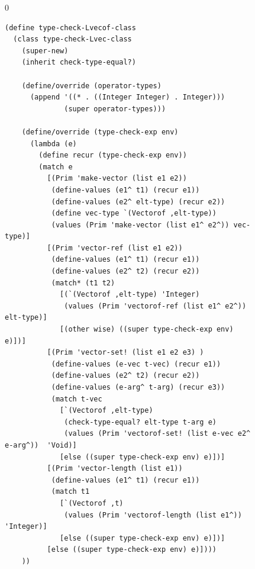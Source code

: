 \documentclass[7x10]{TimesAPriori_MIT}%
\def\racketEd{0}
\def\edition{1}
\numberwithin{theorem}{chapter}
\numberwithin{definition}{chapter}
\numberwithin{equation}{chapter}
\begin{document}
\begin{figure}[tbp]
  \begin{tcolorbox}[colback=white]
{\if\edition\racketEd    
    \begin{lstlisting}[basicstyle=\ttfamily\footnotesize]
(define type-check-Lvecof-class
  (class type-check-Lvec-class
    (super-new)
    (inherit check-type-equal?)

    (define/override (operator-types)
      (append '((* . ((Integer Integer) . Integer)))
              (super operator-types)))
    
    (define/override (type-check-exp env)
      (lambda (e)
        (define recur (type-check-exp env))
        (match e
          [(Prim 'make-vector (list e1 e2))
           (define-values (e1^ t1) (recur e1))
           (define-values (e2^ elt-type) (recur e2))
           (define vec-type `(Vectorof ,elt-type))
           (values (Prim 'make-vector (list e1^ e2^)) vec-type)]
          [(Prim 'vector-ref (list e1 e2))
           (define-values (e1^ t1) (recur e1))
           (define-values (e2^ t2) (recur e2))
           (match* (t1 t2)
             [(`(Vectorof ,elt-type) 'Integer)
              (values (Prim 'vectorof-ref (list e1^ e2^)) elt-type)]
             [(other wise) ((super type-check-exp env) e)])]
          [(Prim 'vector-set! (list e1 e2 e3) )
           (define-values (e-vec t-vec) (recur e1))
           (define-values (e2^ t2) (recur e2))
           (define-values (e-arg^ t-arg) (recur e3))
           (match t-vec
             [`(Vectorof ,elt-type)
              (check-type-equal? elt-type t-arg e)
              (values (Prim 'vectorof-set! (list e-vec e2^ e-arg^))  'Void)]
             [else ((super type-check-exp env) e)])]
          [(Prim 'vector-length (list e1))
           (define-values (e1^ t1) (recur e1))
           (match t1
             [`(Vectorof ,t)
              (values (Prim 'vectorof-length (list e1^))  'Integer)]
             [else ((super type-check-exp env) e)])]
          [else ((super type-check-exp env) e)])))
    ))


\end{lstlisting}}
\end{tcolorbox}
\end{figure}
\end{document}
